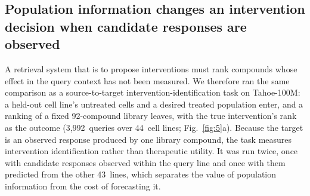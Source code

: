 \documentclass[11pt,letterpaper]{article}
\newcommand{\NCAND}{92}                 %
\newcommand{\NQUERIES}{3,992}           %
\newcommand{\NCTX}{44}                  %
\newcommand{\NFITCTX}{43}               %
\begin{document}
\subsection*{Population information changes an intervention decision when candidate responses are observed}

A retrieval system that is to propose interventions must rank compounds whose effect in the query context has not been measured. We therefore ran the same comparison as a source-to-target intervention-identification task on Tahoe-100M\cite{Tahoe100M}: a held-out cell line's untreated cells and a desired treated population enter, and a ranking of a fixed \NCAND-compound library leaves, with the true intervention's rank as the outcome (\NQUERIES\ queries over \NCTX\ cell lines; Fig.~\ref{fig:5}a). Because the target is an observed response produced by one library compound, the task measures intervention identification rather than therapeutic utility. It was run twice, once with candidate responses observed within the query line and once with them predicted from the other \NFITCTX\ lines, which separates the value of population information from the cost of forecasting it.
\end{document}
